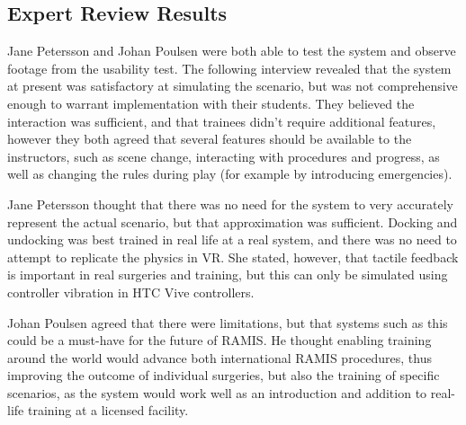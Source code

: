 \subsection{Expert Review Results}

Jane Petersson and Johan Poulsen were both able to test the system and observe footage from the usability test. The following interview revealed that the system at present was satisfactory at simulating the scenario, but was not comprehensive enough to warrant implementation with their students. They believed the interaction was sufficient, and that trainees didn't require additional features, however they both agreed that several features should be available to the instructors, such as scene change, interacting with procedures and progress, as well as changing the rules during play (for example by introducing emergencies). 

Jane Petersson thought that there was no need for the system to very accurately represent the actual scenario, but that approximation was sufficient. Docking and undocking was best trained in real life at a real system, and there was no need to attempt to replicate the physics in VR. She stated, however, that tactile feedback is important in real surgeries and training, but this can only be simulated using controller vibration in HTC Vive controllers.

Johan Poulsen agreed that there were limitations, but that systems such as this could be a must-have for the future of RAMIS. He thought enabling training around the world would advance both international RAMIS procedures, thus improving the outcome of individual surgeries, but also the training of specific scenarios, as the system would work well as an introduction and addition to real-life training at a licensed facility.